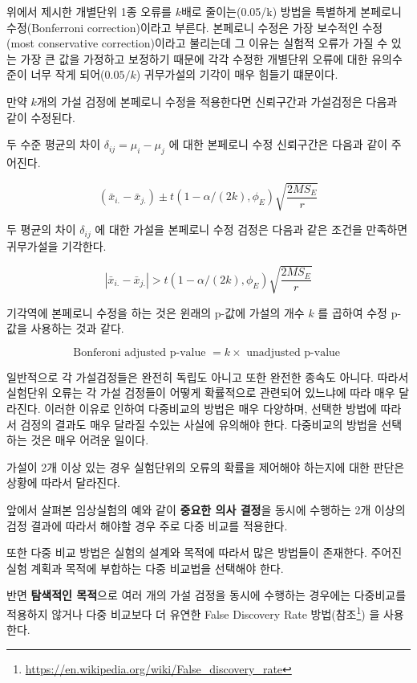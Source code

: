 \documentclass[
]{book}
\makeatletter
\renewcommand{\href}[2]{#2\footnote{\url{#1}}}
\newenvironment{kframe}{%
\medskip{}
\setlength{\fboxsep}{.8em}
 \def\at@end@of@kframe{}%
 \ifinner\ifhmode%
  \def\at@end@of@kframe{\end{minipage}}%
  \begin{minipage}{\columnwidth}%
 \fi\fi%
 \def\FrameCommand##1{\hskip\@totalleftmargin \hskip-\fboxsep
 \colorbox{shadecolor}{##1}\hskip-\fboxsep
     \hskip-\linewidth \hskip-\@totalleftmargin \hskip\columnwidth}%
 \MakeFramed {\advance\hsize-\width
   \@totalleftmargin\z@ \linewidth\hsize
   \@setminipage}}%
 {\par\unskip\endMakeFramed%
 \at@end@of@kframe}
\newenvironment{rmdblock}[1]
  {
  \begin{itemize}
  \renewcommand{\labelitemi}{
    \raisebox{-.7\height}[0pt][0pt]{
      {\setkeys{Gin}{width=3em,keepaspectratio}\texttt{[image: images/\#1]}}
    }
  }
  \setlength{\fboxsep}{1em}
  \begin{kframe}
  \item
  }
  {
  \end{kframe}
  \end{itemize}
  }
\newenvironment{rmdnote}
  {\begin{rmdblock}{note}}
  {\end{rmdblock}}
\theoremstyle{definition}
\theoremstyle{definition}
\theoremstyle{definition}
\theoremstyle{definition}
\theoremstyle{remark}
\makeatother
\begin{document}
위에서 제시한 개별단위 1종 오류를 \(k\)배로 줄이는(0.05/k) 방법을 특별하게
본페로니 수정(Bonferroni correction)이라고 부른다. 본페로니 수정은 가장
보수적인 수정(most conservative correction)이라고 불리는데 그 이유는
실험적 오류가 가질 수 있는 가장 큰 값을 가정하고 보정하기 때문에 각각
수정한 개별단위 오류에 대한 유의수준이 너무 작게 되어(\(0.05/k\))
귀무가설의 기각이 매우 힘들기 떄문이다.

만약 \(k\)개의 가설 검정에 본페로니 수정을 적용한다면 신뢰구간과
가설검정은 다음과 같이 수정된다.

두 수준 평균의 차이 \(\delta_{ij} = \mu_i - \mu_j\) 에 대한 본페로니 수정
신뢰구간은 다음과 같이 주어진다.

\begin{equation}
( \bar {x}_{i.} - \bar {x}_{j.})   \pm t(1-\alpha/(2k), \phi_E) \sqrt{ \frac{2MS_E}{r}} 
\label{eq:twomeancibon}
\end{equation}

두 평균의 차이 \(\delta_{ij}\) 에 대한 가설을 본페로니 수정 검정은 다음과
같은 조건을 만족하면 귀무가설을 기각한다.

\begin{equation}
 \left | \bar {x}_{i.} - \bar {x}_{j.} \right | > t(1-\alpha/(2k), \phi_E) \sqrt{ \frac{2MS_E}{r}} 
\label{eq:lsdbon}
\end{equation}

기각역에 본페로니 수정을 하는 것은 윈래의 p-값에 가설의 개수 \(k\) 를
곱하여 수정 p-값을 사용하는 것과 같다.

\begin{equation}
   \text{Bonferoni adjusted p-value } = k 
   \times \text{ unadjusted p-value } 
\label{eq:pbon}
\end{equation}

일반적으로 각 가설검정들은 완전히 독립도 아니고 또한
완전한 종속도 아니다. 따라서 실험단위 오류는 각 가설 검정들이 어떻게
확률적으로 관련되어 있느냐에 따라 매우 달라진다. 이러한 이유로 인하여
다중비교의 방법은 매우 다양하며, 선택한 방법에 따라서 검정의 결과도 매우
달라질 수있는 사실에 유의해야 한다. 다중비교의 방법을 선택하는 것은 매우
어려운 일이다.

\begin{rmdnote}
가설이 2개 이상 있는 경우 실험단위의 오류의 확률을 제어해야 하는지에 대한 판단은
상황에 따라서 달라진다.

앞에서 살펴본 임상실험의 예와 같이 \textbf{중요한 의사 결정}을 동시에 수행하는 2개 이상의
검정 결과에 따라서 해야할 경우 주로 다중 비교를 적용한다.

또한 다중 비교 방법은 실험의 설계와 목적에 따라서 많은 방법들이 존재한다. 주어진 실험 계획과 목적에 부합하는 다중 비교법을 선택해야 한다.

반면 \textbf{탐색적인 목적}으로 여러 개의 가설 검정을 동시에 수행하는 경우에는 다중비교를 적용하지 않거나
다중 비교보다 더 유연한 False Discovery Rate 방법(\href{https://en.wikipedia.org/wiki/False_discovery_rate}{참조})
을 사용한다.
\end{rmdnote}
\end{document}
